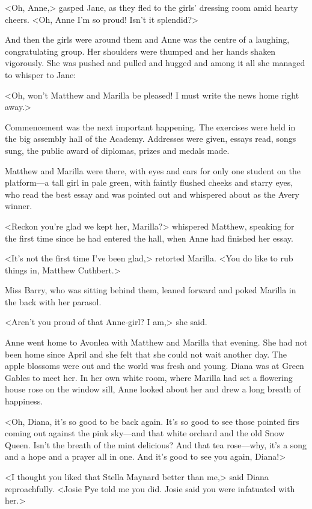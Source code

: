 <Oh, Anne,> gasped Jane, as they fled to the girls' dressing room amid hearty cheers. <Oh, Anne I'm so proud! Isn't it splendid?>

And then the girls were around them and Anne was the centre of a laughing, congratulating group. Her shoulders were thumped and her hands shaken vigorously. She was pushed and pulled and hugged and among it all she managed to whisper to Jane:

<Oh, won't Matthew and Marilla be pleased! I must write the news home right away.>

Commencement was the next important happening. The exercises were held in the big assembly hall of the Academy. Addresses were given, essays read, songs sung, the public award of diplomas, prizes and medals made.

Matthew and Marilla were there, with eyes and ears for only one student on the platform—a tall girl in pale green, with faintly flushed cheeks and starry eyes, who read the best essay and was pointed out and whispered about as the Avery winner.

<Reckon you're glad we kept her, Marilla?> whispered Matthew, speaking for the first time since he had entered the hall, when Anne had finished her essay.

<It's not the first time I've been glad,> retorted Marilla. <You do like to rub things in, Matthew Cuthbert.>

Miss Barry, who was sitting behind them, leaned forward and poked Marilla in the back with her parasol.

<Aren't you proud of that Anne-girl? I am,> she said.

Anne went home to Avonlea with Matthew and Marilla that evening. She had not been home since April and she felt that she could not wait another day. The apple blossoms were out and the world was fresh and young. Diana was at Green Gables to meet her. In her own white room, where Marilla had set a flowering house rose on the window sill, Anne looked about her and drew a long breath of happiness.

<Oh, Diana, it's so good to be back again. It's so good to see those pointed firs coming out against the pink sky—and that white orchard and the old Snow Queen. Isn't the breath of the mint delicious? And that tea rose—why, it's a song and a hope and a prayer all in one. And it's good to see you again, Diana!>

<I thought you liked that Stella Maynard better than me,> said Diana reproachfully. <Josie Pye told me you did. Josie said you were infatuated with her.>

